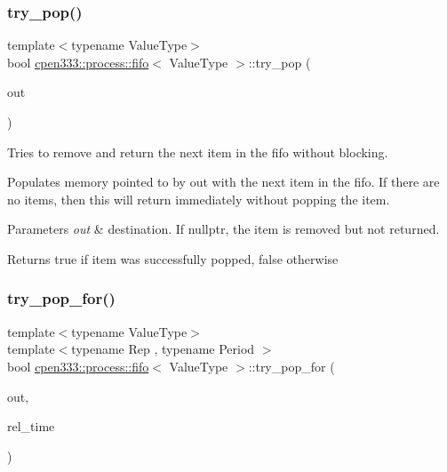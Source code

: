 \subsubsection{\texorpdfstring{try\+\_\+pop()}{try\_pop()}}
{\footnotesize\ttfamily template$<$typename Value\+Type$>$ \\
bool \hyperlink{classcpen333_1_1process_1_1fifo}{cpen333\+::process\+::fifo}$<$ Value\+Type $>$\+::try\+\_\+pop (\begin{DoxyParamCaption}\item[{Value\+Type $\ast$}]{out }\end{DoxyParamCaption})\hspace{0.3cm}{\ttfamily [inline]}}



Tries to remove and return the next item in the fifo without blocking. 

Populates memory pointed to by {\ttfamily out} with the next item in the fifo. If there are no items, then this will return immediately without popping the item.


\begin{DoxyParams}{Parameters}
{\em out} & destination. If {\ttfamily nullptr}, the item is removed but not returned. \\
\hline
\end{DoxyParams}
\begin{DoxyReturn}{Returns}
{\ttfamily true} if item was successfully popped, {\ttfamily false} otherwise 
\end{DoxyReturn}
\mbox{\label{classcpen333_1_1process_1_1fifo_a6411f9f377c2be43500bc53883651120}} 
\subsubsection{\texorpdfstring{try\+\_\+pop\+\_\+for()}{try\_pop\_for()}}
{\footnotesize\ttfamily template$<$typename Value\+Type$>$ \\
template$<$typename Rep , typename Period $>$ \\
bool \hyperlink{classcpen333_1_1process_1_1fifo}{cpen333\+::process\+::fifo}$<$ Value\+Type $>$\+::try\+\_\+pop\+\_\+for (\begin{DoxyParamCaption}\item[{Value\+Type $\ast$}]{out,  }\item[{std\+::chrono\+::duration$<$ Rep, Period $>$ \&}]{rel\+\_\+time }\end{DoxyParamCaption})\hspace{0.3cm}{\ttfamily [inline]}}



